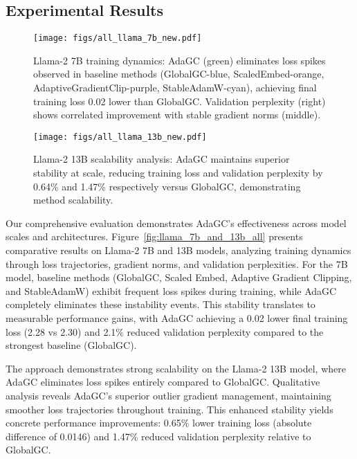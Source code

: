 \subsection{Experimental Results}
\begin{figure*}[!ht]
    \vskip 0.1in
    \centering
    \begin{subfigure}{1.0\textwidth}
        \centering
        \texttt{[image: figs/all\_llama\_7b\_new.pdf]}
        \caption{Llama-2 7B training dynamics: AdaGC (green) eliminates loss spikes observed in baseline methods (GlobalGC-blue, ScaledEmbed-orange, AdaptiveGradientClip-purple, StableAdamW-cyan), achieving final training loss 0.02 lower than GlobalGC. Validation perplexity (right) shows correlated improvement with stable gradient norms (middle).}
        \label{fig:llama_7b}
    \end{subfigure}
    \vfill
    \begin{subfigure}{1.0\textwidth}
        \centering
        \texttt{[image: figs/all\_llama\_13b\_new.pdf]}
        \caption{Llama-2 13B scalability analysis: AdaGC maintains superior stability at scale, reducing training loss and validation perplexity by 0.64\% and 1.47\% respectively versus GlobalGC, demonstrating method scalability.}
        \label{fig:llama_13b}
    \end{subfigure}
    \caption{Large language model training analysis: (a) 7B model comparison shows AdaGC's loss spike elimination and performance gains, (b) 13B results demonstrate method scalability.}
    \label{fig:llama_7b_and_13b_all}
    \vskip -0.2in
\end{figure*}



Our comprehensive evaluation demonstrates AdaGC's effectiveness across model scales and architectures. Figure~\ref{fig:llama_7b_and_13b_all} presents comparative results on Llama-2 7B and 13B models, analyzing training dynamics through loss trajectories, gradient norms, and validation perplexities. For the 7B model, baseline methods (GlobalGC, Scaled Embed, Adaptive Gradient Clipping, and StableAdamW) exhibit frequent loss spikes during training, while AdaGC completely eliminates these instability events. This stability translates to measurable performance gains, with AdaGC achieving a 0.02 lower final training loss (2.28 vs 2.30) and 2.1\% reduced validation perplexity compared to the strongest baseline (GlobalGC).

The approach demonstrates strong scalability on the Llama-2 13B model, where AdaGC eliminates loss spikes entirely compared to GlobalGC. Qualitative analysis reveals AdaGC's superior outlier gradient management, maintaining smoother loss trajectories throughout training. This enhanced stability yields concrete performance improvements: 0.65\% lower training loss (absolute difference of 0.0146) and 1.47\% reduced validation perplexity relative to GlobalGC.

